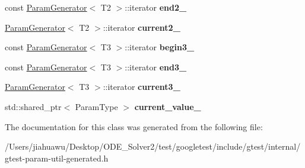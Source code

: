 \begin{DoxyCompactItemize}
const \mbox{\hyperlink{classtesting_1_1internal_1_1_param_generator}{Param\+Generator}}$<$ T2 $>$\+::iterator {\bfseries end2\+\_\+}
\item 
\mbox{\label{classtesting_1_1internal_1_1_cartesian_product_generator3_1_1_iterator_ada694e2af08d227c29477bddcb519f36}} 
\mbox{\hyperlink{classtesting_1_1internal_1_1_param_generator}{Param\+Generator}}$<$ T2 $>$\+::iterator {\bfseries current2\+\_\+}
\item 
\mbox{\label{classtesting_1_1internal_1_1_cartesian_product_generator3_1_1_iterator_a33c84fd689685eba0213b8f21c747bbd}} 
const \mbox{\hyperlink{classtesting_1_1internal_1_1_param_generator}{Param\+Generator}}$<$ T3 $>$\+::iterator {\bfseries begin3\+\_\+}
\item 
\mbox{\label{classtesting_1_1internal_1_1_cartesian_product_generator3_1_1_iterator_a7260bfbe64049028d0cb5d23c2118410}} 
const \mbox{\hyperlink{classtesting_1_1internal_1_1_param_generator}{Param\+Generator}}$<$ T3 $>$\+::iterator {\bfseries end3\+\_\+}
\item 
\mbox{\label{classtesting_1_1internal_1_1_cartesian_product_generator3_1_1_iterator_ab2a3d07bff4c4b9287e362e37be23995}} 
\mbox{\hyperlink{classtesting_1_1internal_1_1_param_generator}{Param\+Generator}}$<$ T3 $>$\+::iterator {\bfseries current3\+\_\+}
\item 
\mbox{\label{classtesting_1_1internal_1_1_cartesian_product_generator3_1_1_iterator_a45fbcc1be2697e644f077276cf31e16e}} 
std\+::shared\+\_\+ptr$<$ Param\+Type $>$ {\bfseries current\+\_\+value\+\_\+}
\end{DoxyCompactItemize}


The documentation for this class was generated from the following file\+:\begin{DoxyCompactItemize}
\item 
/\+Users/jiahuawu/\+Desktop/\+O\+D\+E\+\_\+\+Solver2/test/googletest/include/gtest/internal/gtest-\/param-\/util-\/generated.\+h\end{DoxyCompactItemize}
